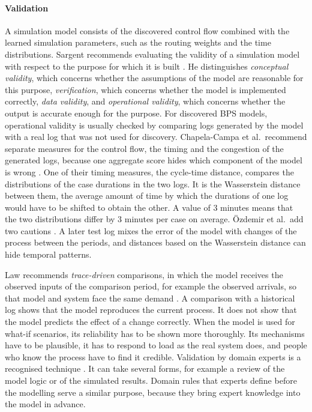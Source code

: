 \paragraph{Validation}
\label{sec:simulation_validation_background}
A simulation model consists of the discovered control flow combined with the
learned simulation parameters, such as the routing weights and the time
distributions. Sargent recommends evaluating the validity of a simulation model with
respect to the purpose for which it is built \cite{Sargent2013Validation}. He
distinguishes \emph{conceptual validity}, which concerns whether the assumptions of
the model are reasonable for this purpose, \emph{verification}, which concerns
whether the model is implemented correctly, \emph{data validity}, and
\emph{operational validity}, which concerns whether the output is accurate enough
for the purpose. For discovered BPS models, operational
validity is usually checked by comparing logs generated by the model with a real
log that was not used for discovery. Chapela-Campa et al.\ recommend separate
measures for the control flow, the timing and the congestion of the generated
logs, because one aggregate score hides which component of the model is wrong
\cite{Chapela2025SimQuality}. One of their timing measures, the
cycle-time distance, compares the distributions of the case durations in the two
logs. It is the Wasserstein distance between them, the average amount of time by
which the durations of one log would have to be shifted to obtain the other. A value
of 3 minutes means that the two distributions differ by 3 minutes per case on
average. Özdemir et al.\ add two
cautions \cite{Oezdemir2025RethinkingBPS}. A later test log mixes the error of
the model with changes of the process between the periods, and distances based
on the Wasserstein distance can hide temporal patterns.

Law recommends \emph{trace-driven} comparisons, in which the model receives the
observed inputs of the comparison period, for example the observed arrivals, so
that model and system face the same demand \cite{Law2015Simulation}. A comparison
with a historical log shows that the model reproduces the current process. It
does not show that the model predicts the effect of a change correctly. When the
model is used for what-if scenarios, its reliability has to be shown more
thoroughly. Its mechanisms have to be plausible, it has to respond to load as the
real system does, and people who know the process have to find it credible.
Validation by domain experts is a recognised technique
\cite{Sargent2013Validation}. It can take several forms, for example a review of
the model logic or of the simulated results. Domain rules that experts define
before the modelling serve a similar purpose, because they bring expert
knowledge into the model in advance.

